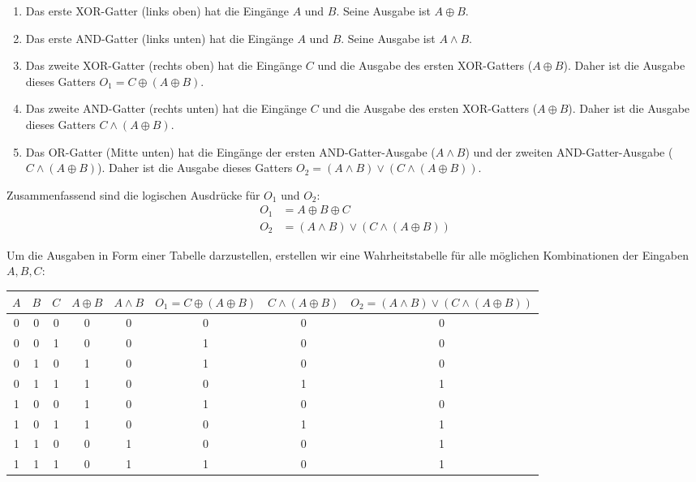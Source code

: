 \documentclass{article}
\begin{document}
\begin{enumerate}
    \item Das erste XOR-Gatter (links oben) hat die Eingänge $A$ und $B$. Seine Ausgabe ist $A \oplus B$.
    \item Das erste AND-Gatter (links unten) hat die Eingänge $A$ und $B$. Seine Ausgabe ist $A \land B$.
    \item Das zweite XOR-Gatter (rechts oben) hat die Eingänge $C$ und die Ausgabe des ersten XOR-Gatters ($A \oplus B$). Daher ist die Ausgabe dieses Gatters $O_1 = C \oplus (A \oplus B)$.
    \item Das zweite AND-Gatter (rechts unten) hat die Eingänge $C$ und die Ausgabe des ersten XOR-Gatters ($A \oplus B$). Daher ist die Ausgabe dieses Gatters $C \land (A \oplus B)$.
    \item Das OR-Gatter (Mitte unten) hat die Eingänge der ersten AND-Gatter-Ausgabe ($A \land B$) und der zweiten AND-Gatter-Ausgabe ($C \land (A \oplus B)$). Daher ist die Ausgabe dieses Gatters $O_2 = (A \land B) \lor (C \land (A \oplus B))$.
\end{enumerate}

Zusammenfassend sind die logischen Ausdrücke für $O_1$ und $O_2$:
\begin{align*}
    O_1 &= A \oplus B \oplus C \\
    O_2 &= (A \land B) \lor (C \land (A \oplus B))
\end{align*}

Um die Ausgaben in Form einer Tabelle darzustellen, erstellen wir eine Wahrheitstabelle für alle möglichen Kombinationen der Eingaben $A, B, C$:

\begin{center}
    \begin{tabular}{|c|c|c||c|c|c|c|c|}
        \hline
        $A$ & $B$ & $C$ & $A \oplus B$ & $A \land B$ & $O_1 = C \oplus (A \oplus B)$ & $C \land (A \oplus B)$ & $O_2 = (A \land B) \lor (C \land (A \oplus B))$ \\
        \hline
        0 & 0 & 0 & 0 & 0 & 0 & 0 & 0 \\
        0 & 0 & 1 & 0 & 0 & 1 & 0 & 0 \\
        0 & 1 & 0 & 1 & 0 & 1 & 0 & 0 \\
        0 & 1 & 1 & 1 & 0 & 0 & 1 & 1 \\
        1 & 0 & 0 & 1 & 0 & 1 & 0 & 0 \\
        1 & 0 & 1 & 1 & 0 & 0 & 1 & 1 \\
        1 & 1 & 0 & 0 & 1 & 0 & 0 & 1 \\
        1 & 1 & 1 & 0 & 1 & 1 & 0 & 1 \\
        \hline
    \end{tabular}
\end{center}
\end{document}
